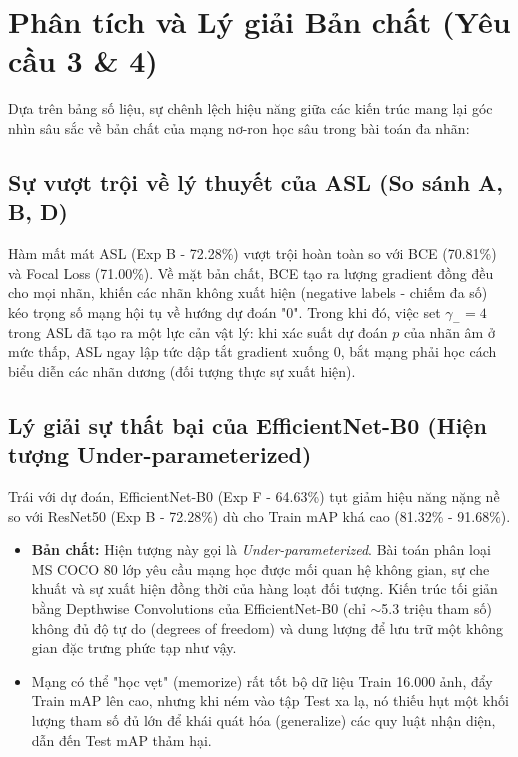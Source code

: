 \documentclass{article}
\begin{document}
\section{Phân tích và Lý giải Bản chất (Yêu cầu 3 \& 4)}

Dựa trên bảng số liệu, sự chênh lệch hiệu năng giữa các kiến trúc mang lại góc nhìn sâu sắc về bản chất của mạng nơ-ron học sâu trong bài toán đa nhãn:

\subsection{Sự vượt trội về lý thuyết của ASL (So sánh A, B, D)}
Hàm mất mát ASL (Exp B - 72.28\%) vượt trội hoàn toàn so với BCE (70.81\%) và Focal Loss (71.00\%). Về mặt bản chất, BCE tạo ra lượng gradient đồng đều cho mọi nhãn, khiến các nhãn không xuất hiện (negative labels - chiếm đa số) kéo trọng số mạng hội tụ về hướng dự đoán "0". Trong khi đó, việc set $\gamma_{-} = 4$ trong ASL đã tạo ra một lực cản vật lý: khi xác suất dự đoán $p$ của nhãn âm ở mức thấp, ASL ngay lập tức dập tắt gradient xuống 0, bắt mạng phải học cách biểu diễn các nhãn dương (đối tượng thực sự xuất hiện).

\subsection{Lý giải sự thất bại của EfficientNet-B0 (Hiện tượng Under-parameterized)}
Trái với dự đoán, EfficientNet-B0 (Exp F - 64.63\%) tụt giảm hiệu năng nặng nề so với ResNet50 (Exp B - 72.28\%) dù cho Train mAP khá cao (81.32\% - 91.68\%).
\begin{itemize}
    \item \textbf{Bản chất:} Hiện tượng này gọi là \textit{Under-parameterized}. Bài toán phân loại MS COCO 80 lớp yêu cầu mạng học được mối quan hệ không gian, sự che khuất và sự xuất hiện đồng thời của hàng loạt đối tượng. Kiến trúc tối giản bằng Depthwise Convolutions của EfficientNet-B0 (chỉ $\sim$5.3 triệu tham số) không đủ độ tự do (degrees of freedom) và dung lượng để lưu trữ một không gian đặc trưng phức tạp như vậy.
    \item Mạng có thể "học vẹt" (memorize) rất tốt bộ dữ liệu Train 16.000 ảnh, đẩy Train mAP lên cao, nhưng khi ném vào tập Test xa lạ, nó thiếu hụt một khối lượng tham số đủ lớn để khái quát hóa (generalize) các quy luật nhận diện, dẫn đến Test mAP thảm hại.
\end{itemize}
\end{document}
